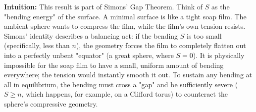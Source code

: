 \begin{solution}
\textbf{Intuition:}
This result is part of Simons' Gap Theorem. Think of $S$ as the "bending energy" of the surface. A minimal surface is like a tight soap film. The ambient sphere wants to compress the film, while the film's own tension resists. Simons' identity describes a balancing act: if the bending $S$ is too small (specifically, less than $n$), the geometry forces the film to completely flatten out into a perfectly unbent "equator" (a great sphere, where $S=0$). It is physically impossible for the soap film to have a small, uniform amount of bending everywhere; the tension would instantly smooth it out. To sustain any bending at all in equilibrium, the bending must cross a "gap" and be sufficiently severe ($S \ge n$, which happens, for example, on a Clifford torus) to counteract the sphere's compressive geometry.
\end{solution}
